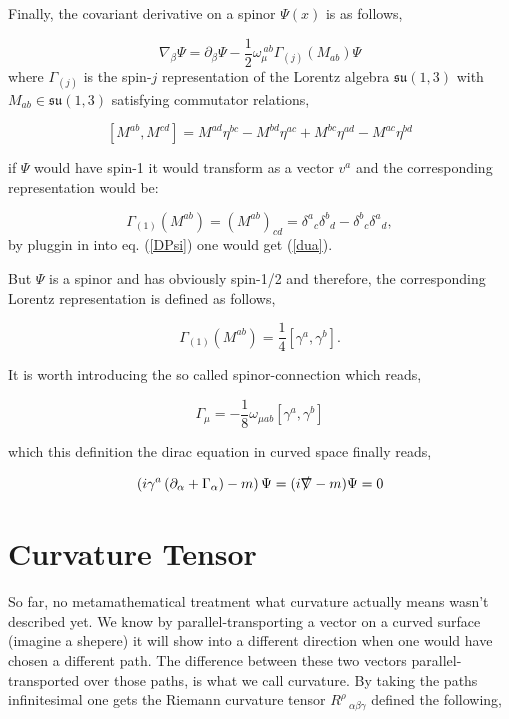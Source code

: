 \documentclass[12pt,a4paper]{article}
\begin{document}
	Finally, the covariant derivative on a spinor $\Psi(x)$ is as follows,
	
	\begin{equation}
		\label{DPsi}
		\nabla_\beta \Psi = \partial_\beta \Psi - \frac{1}{2} \omega_\mu^{\ a b }\Gamma_{(j)}(M_{a b})\Psi
	\end{equation}
	where $\Gamma_{(j)}$ is the spin-$j$ representation of the Lorentz algebra $\mathfrak{su}(1,3)$
	with $M_{a b} \in \mathfrak{su}(1,3)$ satisfying commutator relations,
	
	$$
	[M^{a b },M^{c d }]=M^{a d }\eta ^{b c }-M^{b d }\eta ^{a c }+M^{b c }\eta ^{a d }-M^{a c }\eta ^{b d }
	$$
	
	if $\Psi$ would have spin-1 it would transform as a vector $v^a$ and the corresponding representation would be:
	
	$$
	\Gamma_{(1)}(M^{a b }) = (M^{a b })_{c d }=\delta ^{a }{}_{c }\delta ^{b }{}_{d }-\delta ^{b }{}_{c }\delta ^{a }{}_{d },
	$$
	by pluggin in into eq. (\ref{DPsi}) one would get (\ref{dua}).
	
	But $\Psi$ is a spinor and has obviously spin-1/2 and therefore, the corresponding Lorentz representation is defined as follows,
	
	$$
	\Gamma_{(1)}(M^{a b }) = \frac{1}{4}[\gamma^a, \gamma^b].
	$$
	
	It is worth introducing the so called spinor-connection which reads,
	
	$$
	\Gamma_\mu = -\frac{1}{8} \omega_{\mu a b}[\gamma^a, \gamma^b]
	$$

	which this definition the dirac equation in curved space finally reads,
	
	
	\begin{equation}
		\label{dirac_in_curved}
	\left(i\gamma^a \left( \partial_\alpha + \Gamma_\alpha \right)-m\right)\Psi = (i\slashed{\nabla} - m)\Psi = 0
	\end{equation}
	\section{Curvature Tensor}
	So far, no metamathematical treatment what curvature actually means wasn't described yet.  We know by parallel-transporting a vector on a curved surface (imagine a shepere) it will show into a different direction when one would have chosen a different path. The difference between these two vectors parallel-transported over those paths, is what we call curvature. By taking the paths infinitesimal one gets the Riemann curvature tensor $R^\rho\,_{\alpha \beta  \gamma }$ defined the following,
	
\end{document}
